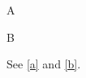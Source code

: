\documentclass{article}
\begin{document}
\begin{center}\captionsetup{type=figure}
\begin{minipage}[t]{0.3\textwidth}A\label{a}\end{minipage}%
\caption{First.}
\end{center}
\begin{center}\captionsetup{type=figure}
\begin{minipage}[t]{0.3\textwidth}B\label{b}\end{minipage}%
\caption{Second.}
\end{center}
See \ref{a} and \ref{b}.
\end{document}
